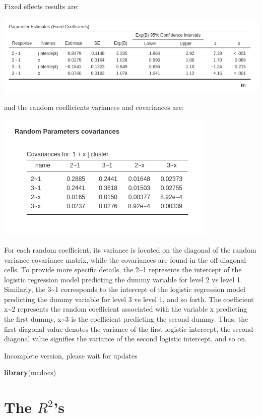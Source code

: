\documentclass[
]{book}
\newenvironment{Shaded}{\begin{snugshade}}{\end{snugshade}}
\newcommand{\FunctionTok}[1]{\textcolor[rgb]{0.13,0.29,0.53}{\textbf{#1}}}
\newcommand{\NormalTok}[1]{#1}
\begin{document}
Fixed effects results are:

\includegraphics[width=0.9\linewidth]{bookletpics/5_multinomial_output1}

and the random coefficients variances and covariances are:

\includegraphics[width=0.5\linewidth]{bookletpics/5_multinomial_output2}

For each random coefficient, its variance is located on the diagonal of the random variance-covariance matrix, while the covariances are found in the off-diagonal cells. To provide more specific details, the 2\textasciitilde1 represents the intercept of the logistic regression model predicting the dummy variable for level 2 vs level 1. Similarly, the 3\textasciitilde1 corresponds to the intercept of the logistic regression model predicting the dummy variable for level 3 vs level 1, and so forth. The coefficient x\textasciitilde2 represents the random coefficient associated with the variable x predicting the first dummy, x\textasciitilde3 is the coefficient predicting the second dummy. Thus, the first diagonal value denotes the variance of the first logistic intercept, the second diagonal value signifies the variance of the second logistic intercept, and so on.

{ Incomplete version, please wait for updates }

\hypertarget{appendix-appendix}{%
\appendix}


\begin{Shaded}
\begin{Highlighting}[]
\FunctionTok{library}\NormalTok{(mcdocs)}
\end{Highlighting}
\end{Shaded}

\hypertarget{appendixa}{%
\chapter{\texorpdfstring{The \(R^2\)'s}{The R\^{}2's}}\label{appendixa}}
\end{document}
